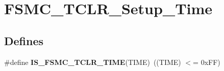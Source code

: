 \hypertarget{group__FSMC__TCLR__Setup__Time}{
\section{FSMC\_\-TCLR\_\-Setup\_\-Time}
\label{group__FSMC__TCLR__Setup__Time}
}
\subsection*{Defines}
\begin{DoxyCompactItemize}
\item 
\hypertarget{group__FSMC__TCLR__Setup__Time_ga324848d0d9c0d2aad7ab70873b4a15e9}{
\#define {\bfseries IS\_\-FSMC\_\-TCLR\_\-TIME}(TIME)~((TIME) $<$= 0xFF)}
\label{group__FSMC__TCLR__Setup__Time_ga324848d0d9c0d2aad7ab70873b4a15e9}

\end{DoxyCompactItemize}
